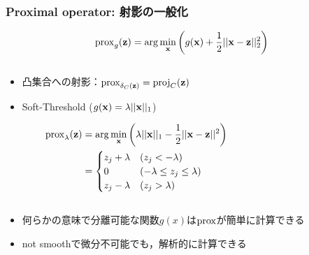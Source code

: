 \documentclass[9pt, dvipdfmx]{beamer}
\begin{document}
\begin{frame}
  \frametitle{Proximal operator: 射影の一般化}
  \begin{equation*}
    {\rm prox}_g({\bf z}) = \arg\min_{\bf x} \left( g({\bf x}) + \frac{1}{2}||{\bf x} - {\bf z}||^2_2 \right)
  \end{equation*}
  \begin{columns}
    \begin{column}[t]{.7\textwidth}
      \begin{itemize}
        \item 凸集合への射影：${\rm prox}_{\delta_C({\bf z})} = {\rm proj}_C({\bf z})$
        \item Soft-Threshold ($g({\bf x})=\lambda||{\bf x}||_1$)
      \end{itemize}
      \begin{align*}
        {\rm prox}_\lambda ({\bf z}) &= \arg\min_{\bf x} \left( \lambda||{\bf x}||_1 - \frac{1}{2}||{\bf x} - {\bf z}||^2 \right)\\
        &= \begin{cases}
          z_j + \lambda & (z_j < - \lambda)\\
          0 & (-\lambda \leq z_j \leq \lambda)\\
          z_j - \lambda & (z_j > \lambda)
        \end{cases}
      \end{align*}
    \end{column}
    \begin{column}[t]{.3\textwidth}
    \end{column}
  \end{columns}
  \begin{itemize}
    \item 何らかの意味で\alert{分離可能}な関数$g(x)$は${\rm prox}$が簡単に計算できる
    \item not smoothで微分不可能でも，解析的に計算できる
  \end{itemize}

\end{frame}

\end{document}

